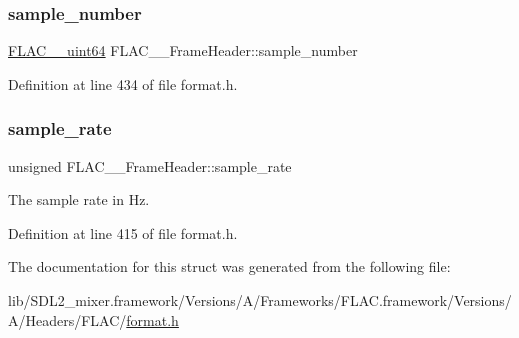 \subsubsection{\texorpdfstring{sample\_number}{sample\_number}}
{\footnotesize\ttfamily \mbox{\hyperlink{ordinals_8h_aa78c8c70a3eb8a58af7436f278acde8e}{F\+L\+A\+C\+\_\+\+\_\+uint64}} F\+L\+A\+C\+\_\+\+\_\+\+Frame\+Header\+::sample\+\_\+number}



Definition at line 434 of file format.\+h.

\mbox{\label{struct_f_l_a_c_____frame_header_acc23daa576f4e75885bf4f2b69cee1be}} 
\subsubsection{\texorpdfstring{sample\_rate}{sample\_rate}}
{\footnotesize\ttfamily unsigned F\+L\+A\+C\+\_\+\+\_\+\+Frame\+Header\+::sample\+\_\+rate}

The sample rate in Hz. 

Definition at line 415 of file format.\+h.



The documentation for this struct was generated from the following file\+:\begin{DoxyCompactItemize}
\item 
lib/\+S\+D\+L2\+\_\+mixer.\+framework/\+Versions/\+A/\+Frameworks/\+F\+L\+A\+C.\+framework/\+Versions/\+A/\+Headers/\+F\+L\+A\+C/\mbox{\hyperlink{format_8h}{format.\+h}}\end{DoxyCompactItemize}
